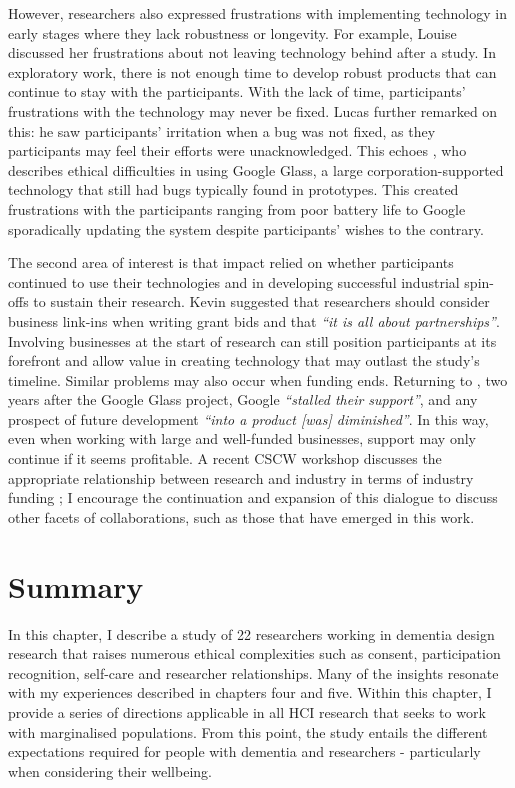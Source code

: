 However, researchers also expressed frustrations with implementing technology in early stages where they lack robustness or longevity. For example, Louise discussed her frustrations about not leaving technology behind after a study. In exploratory work, there is not enough time to develop robust products that can continue to stay with the participants. With the lack of time, participants' frustrations with the technology may never be fixed. Lucas further remarked on this: he saw participants' irritation when a bug was not fixed, as they participants may feel their efforts were unacknowledged. This echoes \cite{vines_our_2017}, who describes ethical difficulties in using Google Glass, a large corporation-supported technology that still had bugs typically found in prototypes. This created frustrations with the participants ranging from poor battery life to Google sporadically updating the system despite participants' wishes to the contrary. 

The second area of interest is that impact relied on whether participants continued to use their technologies and in developing successful industrial spin-offs to sustain their research. Kevin suggested that researchers should consider business link-ins when writing grant bids and that \textit{``it is all about partnerships''}. Involving businesses at the start of research can still position participants at its forefront and allow value in creating technology that may outlast the study’s timeline. Similar problems may also occur when funding ends. Returning to \cite{vines_our_2017}, two years after the Google Glass project, Google \textit{``stalled their support''}, and any prospect of future development \textit{``into a product [was] diminished''}. In this way, even when working with large and well-funded businesses, support may only continue if it seems profitable. A recent CSCW workshop discusses the appropriate relationship between research and industry in terms of industry funding \citep{group_patron_2019}; I encourage the continuation and expansion of this dialogue to discuss other facets of collaborations, such as those that have emerged in this work.

\section{Summary}
\label{Ethics:Summary}
In this chapter, I describe a study of 22 researchers working in dementia design research that raises numerous ethical complexities such as consent, participation recognition, self-care and researcher relationships. Many of the insights resonate with my experiences described in chapters four and five. Within this chapter, I provide a series of directions applicable in all HCI research that seeks to work with marginalised populations. From this point, the study entails the different expectations required for people with dementia and researchers - particularly when considering their wellbeing.

